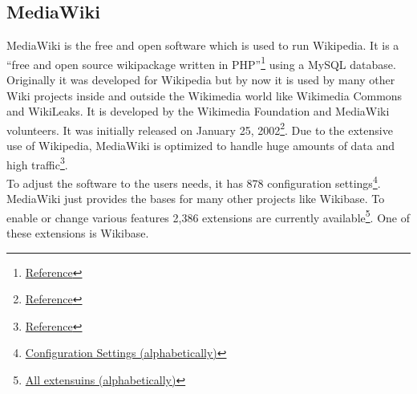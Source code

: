 \subsection{MediaWiki}

MediaWiki is the free and open software which is used to run Wikipedia. It is a ``free and open source wikipackage written in PHP''\footnote{\href{https://www.mediawiki.org/wiki/MediaWiki}{Reference}} using a MySQL database. Originally it was developed for Wikipedia but by now it is used by many other Wiki projects inside and outside the Wikimedia world like Wikimedia Commons and WikiLeaks. It is developed by the Wikimedia Foundation and MediaWiki volunteers. It was initially released on January 25, 2002\footnote{\href{https://en.wikipedia.org/wiki/MediaWiki}{Reference}}. Due to the extensive use of Wikipedia, MediaWiki is optimized to handle huge amounts of data and high traffic\footnote{\href{https://www.mediawiki.org/w/index.php?title=Manual:What_is_MediaWiki\%3F&oldid=743778}{Reference}}. \\
To adjust the software to the users needs, it has 878 configuration settings\footnote{\href{https://www.mediawiki.org/wiki/Manual:Configuration_settings_\%28alphabetical\%29}{Configuration Settings (alphabetically)}}. \\
MediaWiki just provides the bases for many other projects like Wikibase. To enable or change various features 2,386 extensions are currently available\footnote{\href{https://www.mediawiki.org/wiki/Category:All_extensions}{All extensuins (alphabetically)}}. One of these extensions is Wikibase.